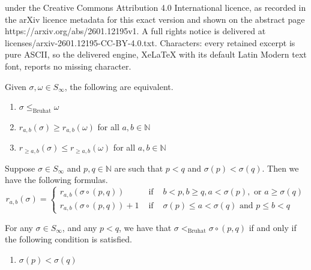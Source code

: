 \documentclass[10pt,a4paper]{amsart}
\newcommand{\nn}{\ensuremath{\mathbb{N}}}
\begin{document}
under the Creative Commons Attribution 4.0 International licence, as recorded in the arXiv licence metadata for this exact version and shown on the abstract page https://arxiv.org/abs/2601.12195v1. A full rights notice is delivered at licenses/arxiv-2601.12195-CC-BY-4.0.txt. Characters: every retained excerpt is pure ASCII, so the delivered engine, XeLaTeX with its default Latin Modern text font, reports no missing character.
\begin{proposition}\label{prop: region criterion for bruhat order}
Given $\sigma, \omega \in S_\infty$, the following are equivalent. 

\begin{enumerate}
    \item $\sigma \leq_\text{Bruhat} \omega$
    \item $r_{a , b}(\sigma) \geq r_{a , b}(\omega)$ for all $a , b \in \nn$
    \item $r_{\geq a , b}(\sigma) \leq r_{\geq a , b}(\omega)$ for all $a , b \in \nn$
\end{enumerate}
\end{proposition}

\begin{lemma}\label{lem: ones in boxes after applying a transposition}
    Suppose $\sigma \in S_\infty$ and $p , q \in \nn$ are such that $p < q$ and $\sigma(p) < \sigma(q)$. Then we have the following formulas. 
    \begin{equation*}
        r_{a , b}(\sigma) = \left\{ \begin{matrix} r_{a , b}(\sigma \circ (p , q)) & \text{ if } & b < p, b \geq q , a < \sigma(p), \text{ or } a \geq \sigma(q) \\ r_{a , b}(\sigma \circ (p , q)) + 1 & \text{ if } & \sigma(p) \leq a < \sigma(q) \text{ and } p \leq b < q  \end{matrix} \right. 
    \end{equation*} 
\end{lemma}

\begin{proposition}\label{prop: transposition going up in bruhat}
    For any $\sigma \in S_\infty$, and any $p < q$, we have that $\sigma <_\text{Bruhat} \sigma \circ (p , q)$ if and only if the following condition is satisfied.
    \begin{enumerate}
        \item[(C1)] $\sigma(p) < \sigma(q)$
    \end{enumerate} 
\end{proposition}
\end{document}
